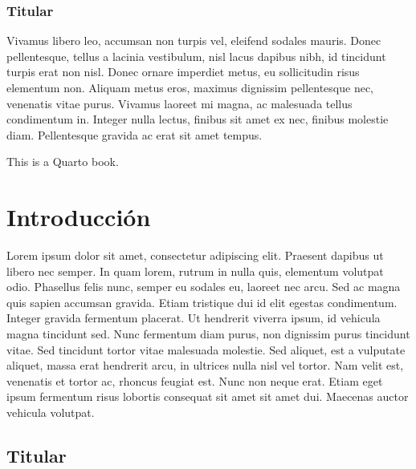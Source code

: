 \documentclass[
  letterpaper,
  DIV=11,
  numbers=noendperiod]{scrreprt}
\begin{document}
\hypertarget{titular-1}{%
\subsection*{Titular}\label{titular-1}}

Vivamus libero leo, accumsan non turpis vel, eleifend sodales mauris.
Donec pellentesque, tellus a lacinia vestibulum, nisl lacus dapibus
nibh, id tincidunt turpis erat non nisl. Donec ornare imperdiet metus,
eu sollicitudin risus elementum non. Aliquam metus eros, maximus
dignissim pellentesque nec, venenatis vitae purus. Vivamus laoreet mi
magna, ac malesuada tellus condimentum in. Integer nulla lectus, finibus
sit amet ex nec, finibus molestie diam. Pellentesque gravida ac erat sit
amet tempus.

This is a Quarto book.


\hypertarget{introducciuxf3n}{%
\chapter*{Introducción}\label{introducciuxf3n}}


Lorem ipsum dolor sit amet, consectetur adipiscing elit. Praesent
dapibus ut libero nec semper. In quam lorem, rutrum in nulla quis,
elementum volutpat odio. Phasellus felis nunc, semper eu sodales eu,
laoreet nec arcu. Sed ac magna quis sapien accumsan gravida. Etiam
tristique dui id elit egestas condimentum. Integer gravida fermentum
placerat. Ut hendrerit viverra ipsum, id vehicula magna tincidunt sed.
Nunc fermentum diam purus, non dignissim purus tincidunt vitae. Sed
tincidunt tortor vitae malesuada molestie. Sed aliquet, est a vulputate
aliquet, massa erat hendrerit arcu, in ultrices nulla nisl vel tortor.
Nam velit est, venenatis et tortor ac, rhoncus feugiat est. Nunc non
neque erat. Etiam eget ipsum fermentum risus lobortis consequat sit amet
sit amet dui. Maecenas auctor vehicula volutpat.

\hypertarget{titular-2}{%
\section*{Titular}\label{titular-2}}

\end{document}
